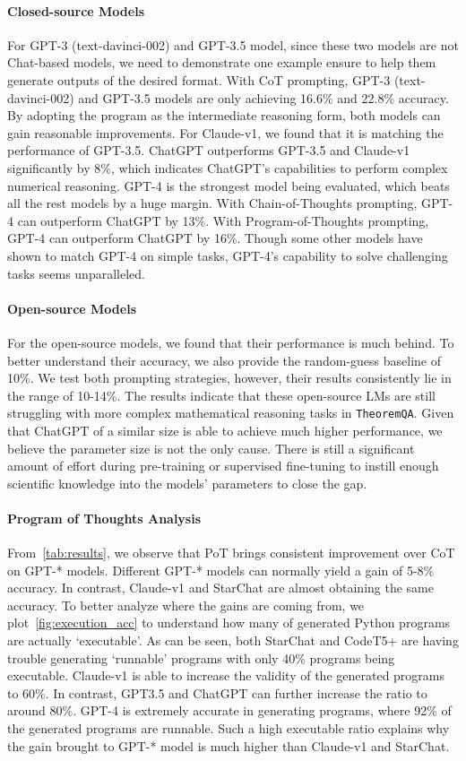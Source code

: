 \documentclass[11pt]{article}
\newcommand{\dataset}{\texttt{TheoremQA}\xspace}
\begin{document}
\paragraph{Closed-source Models}
For GPT-3 (text-davinci-002) and GPT-3.5 model, since these two models are not Chat-based models, we need to demonstrate one example ensure to help them generate outputs of the desired format. With CoT prompting, GPT-3 (text-davinci-002) and GPT-3.5 models are only achieving 16.6\% and 22.8\% accuracy. By adopting the program as the intermediate reasoning form, both models can gain reasonable improvements. For Claude-v1, we found that it is matching the performance of GPT-3.5. ChatGPT outperforms GPT-3.5 and Claude-v1 significantly by 8\%, which indicates ChatGPT's capabilities to perform complex numerical reasoning. GPT-4 is the strongest model being evaluated, which beats all the rest models by a huge margin. With Chain-of-Thoughts prompting, GPT-4 can outperform ChatGPT by 13\%. With Program-of-Thoughts prompting, GPT-4 can outperform ChatGPT by 16\%. Though some other models have shown to match GPT-4 on simple tasks, GPT-4's capability to solve challenging tasks seems unparalleled. 

\paragraph{Open-source Models}
For the open-source models, we found that their performance is much behind. To better understand their accuracy, we also provide the random-guess baseline of 10\%. We test both prompting strategies, however, their results consistently lie in the range of 10-14\%. The results indicate that these open-source LMs are still struggling with more complex mathematical reasoning tasks in \dataset. Given that ChatGPT of a similar size is able to achieve much higher performance, we believe the parameter size is not the only cause. There is still a significant amount of effort during pre-training or supervised fine-tuning to instill enough scientific knowledge into the models' parameters to close the gap.

\paragraph{Program of Thoughts Analysis}
From~\autoref{tab:results}, we observe that PoT brings consistent improvement over CoT on GPT-* models. Different GPT-* models can normally yield a gain of 5-8\% accuracy. In contrast, Claude-v1 and StarChat are almost obtaining the same accuracy. To better analyze where the gains are coming from, we plot~\autoref{fig:execution_acc} to understand how many of generated Python programs are actually `executable'. As can be seen, both StarChat and CodeT5+ are having trouble generating `runnable' programs with only 40\% programs being executable. Claude-v1 is able to increase the validity of the generated programs to 60\%. In contrast, GPT3.5 and ChatGPT can further increase the ratio to around 80\%. GPT-4 is extremely accurate in generating programs, where 92\% of the generated programs are runnable. Such a high executable ratio explains why the gain brought to GPT-* model is much higher than Claude-v1 and StarChat.
\end{document}
